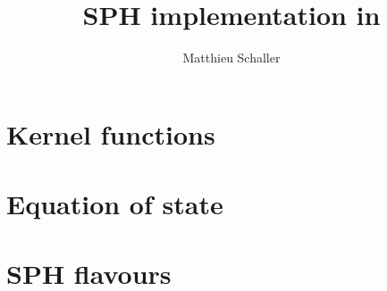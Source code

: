 \documentclass[fleqn, usenatbib, useAMS]{mnras}
\title{SPH implementation in \swift}
\author{Matthieu Schaller}
\begin{document}
\maketitle
\section{Kernel functions}


\section{Equation of state}


\section{SPH flavours}




\end{document}

